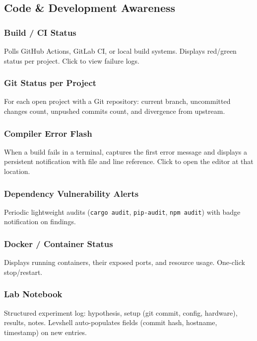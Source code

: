 \documentclass[11pt,a4paper]{article}
\begin{document}
\subsection{Code \& Development Awareness}
\label{sec:features-code}

\subsubsection{Build / CI Status}
Polls GitHub Actions, GitLab CI, or local build systems. Displays red/green status per project. Click to view failure logs.

\subsubsection{Git Status per Project}
For each open project with a Git repository: current branch, uncommitted changes count, unpushed commits count, and divergence from upstream.

\subsubsection{Compiler Error Flash}
When a build fails in a terminal, captures the first error message and displays a persistent notification with file and line reference. Click to open the editor at that location.

\subsubsection{Dependency Vulnerability Alerts}
Periodic lightweight audits (\texttt{cargo audit}, \texttt{pip-audit}, \texttt{npm audit}) with badge notification on findings.

\subsubsection{Docker / Container Status}
Displays running containers, their exposed ports, and resource usage. One-click stop/restart.

\subsubsection{Lab Notebook}
Structured experiment log: hypothesis, setup (git commit, config, hardware), results, notes. Levshell auto-populates fields (commit hash, hostname, timestamp) on new entries.
\end{document}
